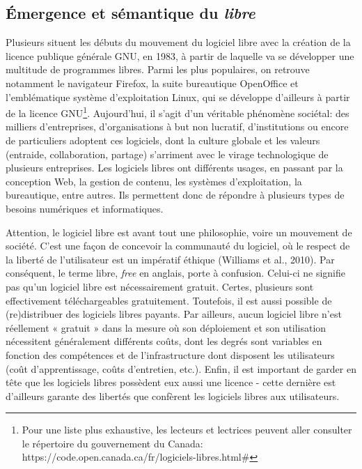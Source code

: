 \documentclass[
  letterpaper,
  DIV=11,
  numbers=noendperiod]{scrreprt}
\begin{document}
\subsection{\texorpdfstring{Émergence et sémantique du
\emph{libre}}{Émergence et sémantique du libre}}\label{uxe9mergence-et-suxe9mantique-du-libre}

Plusieurs situent les débuts du mouvement du logiciel libre avec la
création de la licence publique générale GNU, en 1983, à partir de
laquelle va se développer une multitude de programmes libres. Parmi les
plus populaires, on retrouve notamment le navigateur Firefox, la suite
bureautique OpenOffice et l'emblématique système d'exploitation Linux,
qui se développe d'ailleurs à partir de la licence GNU\footnote{Pour une
  liste plus exhaustive, les lecteurs et lectrices peuvent aller
  consulter le répertoire du gouvernement du Canada:
  https://code.open.canada.ca/fr/logiciels-libres.html\#}. Aujourd'hui,
il s'agit d'un véritable phénomène sociétal: des milliers d'entreprises,
d'organisations à but non lucratif, d'institutions ou encore de
particuliers adoptent ces logiciels, dont la culture globale et les
valeurs (entraide, collaboration, partage) s'arriment avec le virage
technologique de plusieurs entreprises. Les logiciels libres ont
différents usages, en passant par la conception Web, la gestion de
contenu, les systèmes d'exploitation, la bureautique, entre autres. Ils
permettent donc de répondre à plusieurs types de besoins numériques et
informatiques.

Attention, le logiciel libre est avant tout une philosophie, voire un
mouvement de société. C'est une façon de concevoir la communauté du
logiciel, où le respect de la liberté de l'utilisateur est un impératif
éthique (Williams et al., 2010). Par conséquent, le terme libre,
\emph{free} en anglais, porte à confusion. Celui-ci ne signifie pas
qu'un logiciel libre est nécessairement gratuit. Certes, plusieurs sont
effectivement téléchargeables gratuitement. Toutefois, il est aussi
possible de (re)distribuer des logiciels libres payants. Par ailleurs,
aucun logiciel libre n'est réellement « gratuit » dans la mesure où son
déploiement et son utilisation nécessitent généralement différents
coûts, dont les degrés sont variables en fonction des compétences et de
l'infrastructure dont disposent les utilisateurs (coût d'apprentissage,
coûts d'entretien, etc.). Enfin, il est important de garder en tête que
les logiciels libres possèdent eux aussi une licence - cette dernière
est d'ailleurs garante des libertés que confèrent les logiciels libres
aux utilisateurs.
\end{document}

